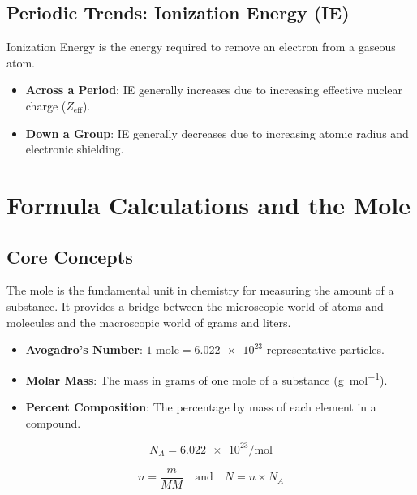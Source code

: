 \documentclass[11pt]{article}
\begin{document}
\subsection{Periodic Trends: Ionization Energy (IE)}
Ionization Energy is the energy required to remove an electron from a gaseous atom.
\begin{itemize}
    \item \textbf{Across a Period}: IE generally increases due to increasing effective nuclear charge ($Z_{\text{eff}}$).
    \item \textbf{Down a Group}: IE generally decreases due to increasing atomic radius and electronic shielding.
\end{itemize}

\newpage

\section{Formula Calculations and the Mole}

\subsection{Core Concepts}
The mole is the fundamental unit in chemistry for measuring the amount of a substance. It provides a bridge between the microscopic world of atoms and molecules and the macroscopic world of grams and liters.

\begin{itemize}[noitemsep]
    \item \textbf{Avogadro's Number}: $1 \text{ mole} = \num{6.022e23}$ representative particles.
    \item \textbf{Molar Mass}: The mass in grams of one mole of a substance (\si{\gram\per\mole}).
    \item \textbf{Percent Composition}: The percentage by mass of each element in a compound.
\end{itemize}

\begin{tcolorbox}[provided, title=Avogadro Constant (Provided)]
    \[ N_A = \num{6.022e23} \si{\per\mole} \]
\end{tcolorbox}

\begin{tcolorbox}[memorize, title=Mole Calculations *]
    \[ n = \frac{m}{MM} \quad \text{and} \quad N = n \times N_A \]
\end{tcolorbox}
\end{document}
